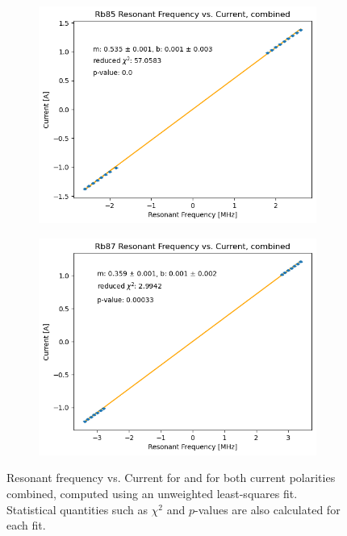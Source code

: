 \documentclass[10pt]{article}
\begin{document}
	\begin{figure}
		\centering
		\begin{subfigure}{0.4\textwidth}
			\includegraphics[scale=0.4]{images/rb85-combined.png}
			\caption{}
		\end{subfigure}
		\begin{subfigure}{0.4\textwidth}
			\includegraphics[scale=0.4]{images/rb87-combined.png}
			\caption{}
		\end{subfigure}
		\caption{Resonant frequency vs. Current for  and  for
			both current polarities combined,
			computed using an unweighted least-squares fit. 
			Statistical quantities such as \( \chi^2 \) and \( p \)-values are also 
		calculated for each fit.}  
		\label{res-current-combined}
	\end{figure}
\end{document}
